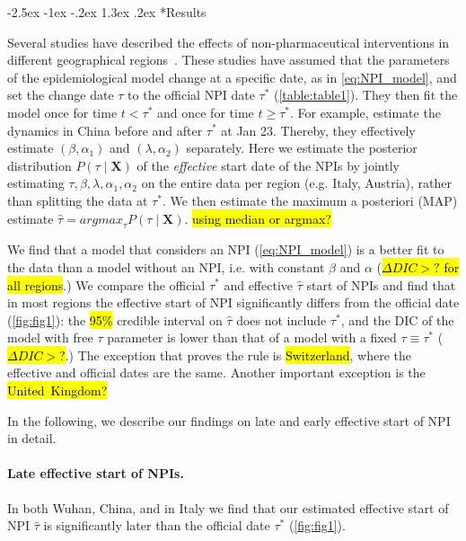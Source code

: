 \documentclass[12pt]{extarticle}
\makeatletter
\renewcommand\section{\@startsection {section}{1}{\z@}%
     {-2.5ex \@plus -1ex \@minus -.2ex}%
     {1.3ex \@plus.2ex}%
    {\Large\bfseries}}
\let\vec\mathbf
\makeatother
\begin{document}
\section*{Results}

Several studies have described the effects of non-pharmaceutical interventions in different geographical regions~\citep{Flaxman2020,Gatto2020,Li2020}. 
These studies have assumed that the parameters of the epidemiological model change at a specific date, as in \autoref{eq:NPI_model}, and set the change date $\tau$ to the official NPI date $\tau^*$ (\autoref{table:table1}).
They then fit the model once for time $t<\tau^*$ and once for time $t \ge \tau^*$.
For example, \citet{Li2020} estimate the dynamics in China before and after $\tau^*$ at Jan 23. Thereby, they effectively estimate $(\beta, \alpha_1)$ and $(\lambda, \alpha_2)$ separately.
Here we estimate the posterior distribution $P(\tau \mid \vec{X})$ of the \emph{effective} start date of the NPIs by jointly estimating $\tau, \beta, \lambda, \alpha_1, \alpha_2$ on the entire data per region (e.g. Italy, Austria), rather than splitting the data at $\tau^*$.
We then estimate the maximum a posteriori (MAP) estimate $\hat{\tau}=\mathit{argmax}_{\tau}{P(\tau \mid \vec{X})}$. \hl{using median or argmax?}

We find that a model that considers an NPI (\autoref{eq:NPI_model}) is a better fit to the data than a model without an NPI, i.e. with constant $\beta$ and $\alpha$ (\hl{$\Delta DIC > ?$ for all regions}.)
We compare the official $\tau^*$ and effective $\hat{\tau}$ start of NPIs and find that in most regions the effective start of NPI  significantly differs from the official date (\autoref{fig:fig1}): the \hl{95\%} credible interval on $\hat{\tau}$ does not include $\tau^*$, and the DIC of the model with free $\tau$ parameter is lower than that of a model with a fixed $\tau \equiv \tau^*$ (\hl{$\Delta DIC > ?$}.) The exception that proves the rule is \hl{Switzerland}, where the effective and official dates are the same. Another important exception is the \hl{United~Kingdom?} %

In the following, we describe our findings on late and early effective start of NPI in detail.



\paragraph*{Late effective start of NPIs.}
In both Wuhan, China, and in Italy we find that our estimated effective start of NPI $\hat{\tau}$ is significantly later than the official date $\tau^*$ (\autoref{fig:fig1}). 
\end{document}
